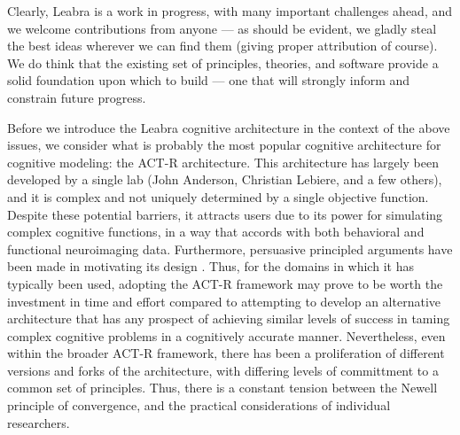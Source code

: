 \documentclass[11pt,twoside]{article}
\begin{document}
Clearly, Leabra is a work in progress, with many important challenges ahead,
and we welcome contributions from anyone --- as should be evident, we gladly
steal the best ideas wherever we can find them (giving proper attribution of
course).  We do think that the existing set of principles, theories, and
software provide a solid foundation upon which to build --- one that will
strongly inform and constrain future progress.

Before we introduce the Leabra cognitive architecture in the context of the
above issues, we consider what is probably the most popular cognitive
architecture for cognitive modeling: the ACT-R architecture.  This
architecture has largely been developed by a single lab (John Anderson,
Christian Lebiere, and a few others), and it is complex and not uniquely
determined by a single objective function.  Despite these potential barriers,
it attracts users due to its power for simulating complex cognitive functions,
in a way that accords with both behavioral and functional neuroimaging data.
Furthermore, persuasive principled arguments have been made in motivating its
design \cite{Anderson83,Anderson90,Anderson93,AndersonBothellByrneEtAl04}.
Thus, for the domains in which it has typically been used, adopting the ACT-R
framework may prove to be worth the investment in time and effort compared to
attempting to develop an alternative architecture that has any prospect of
achieving similar levels of success in taming complex cognitive problems in a
cognitively accurate manner.  Nevertheless, even within the broader ACT-R
framework, there has been a proliferation of different versions and forks of
the architecture, with differing levels of committment to a common set of
principles.  Thus, there is a constant tension between the Newell principle of
convergence, and the practical considerations of individual researchers.





\end{document}
